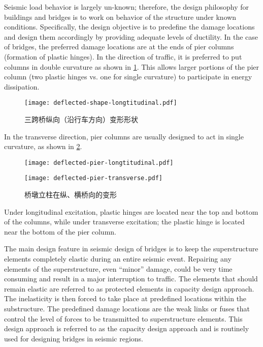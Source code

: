 Seismic load behavior is largely un-known; therefore, the design philosophy for buildings and bridges is to work on behavior of the structure under known conditions. Specifically, the design objective is to predefine the damage locations and design them accordingly by providing adequate levels of ductility. In the case of bridges, the preferred damage locations are at the ends of pier columns (formation of plastic hinges). In the direction of traffic, it is preferred to put columns in double curvature as shown in \cref{fig:deflected-shape-longtitudinal}. This allows larger portions of the pier column (two plastic hinges vs. one for single curvature) to participate in energy dissipation.

\begin{figure}
  \texttt{[image: deflected-shape-longtitudinal.pdf]}
  \caption{三跨桥纵向（沿行车方向）变形形状}
  \label{fig:deflected-shape-longtitudinal}
\end{figure}

In the transverse direction, pier columns are usually designed to act in single curvature, as shown in \cref{fig:deflected-shape-longtitudinal-transverse}.

\begin{figure}
  \begin{minipage}{0.45\linewidth}\centering
  \texttt{[image: deflected-pier-longtitudinal.pdf]} 
  \end{minipage}
  \begin{minipage}{0.45\linewidth}\centering
  \texttt{[image: deflected-pier-transverse.pdf]}
  \end{minipage}
  \caption{桥墩立柱在纵、横桥向的变形}
  \label{fig:deflected-shape-longtitudinal-transverse}
\end{figure}

Under longitudinal excitation, plastic hinges are located near the top and bottom of the columns, while under transverse excitation; the plastic hinge is located near the bottom of the pier column.

The main design feature in seismic design of bridges is to keep the superstructure elements completely elastic during an entire seismic event. Repairing any elements of the superstructure, even “minor” damage, could be very time consuming and result in a major interruption to traffic. The elements that should remain elastic are referred to as protected elements in capacity design approach. The inelasticity is then forced to take place at predefined locations within the substructure. The predefined damage locations are the weak links or fuses that control the level of forces to be transmitted to superstructure elements. This design approach is referred to as the capacity design approach and is routinely used for designing bridges in seismic regions.

